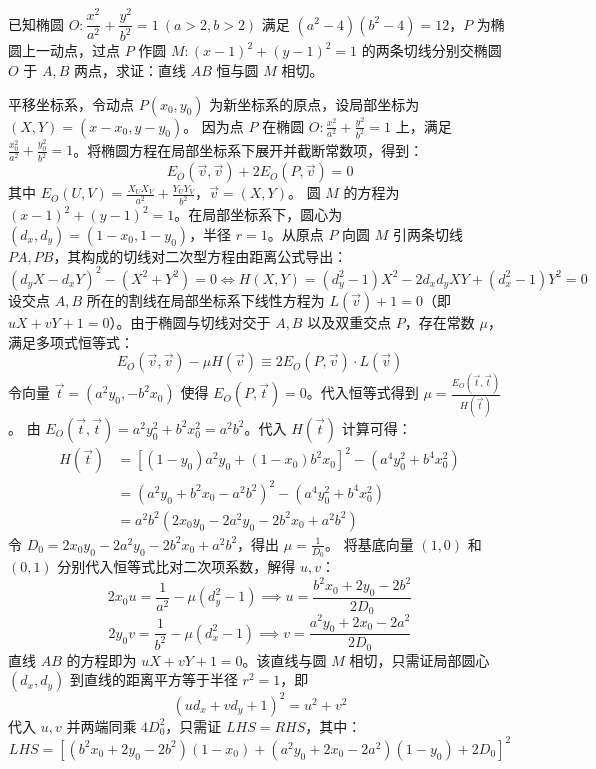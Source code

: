 \begin{exercise}
已知椭圆 \( O: \dfrac{x^2}{a^2} + \dfrac{y^2}{b^2} = 1 \ (a>2,b>2) \) 满足 \( (a^2-4)(b^2-4)=12 \)，\( P \) 为椭圆上一动点，过点 \( P \) 作圆 \( M: (x-1)^2 + (y-1)^2 = 1 \) 的两条切线分别交椭圆 \( O \) 于 \( A,B \) 两点，求证：直线 \( AB \) 恒与圆 \( M \) 相切。
\end{exercise}
\begin{solution}
平移坐标系，令动点 $P(x_0, y_0)$ 为新坐标系的原点，设局部坐标为 $(X, Y) = (x-x_0, y-y_0)$。
因为点 $P$ 在椭圆 $O: \frac{x^2}{a^2} + \frac{y^2}{b^2} = 1$ 上，满足 $\frac{x_0^2}{a^2} + \frac{y_0^2}{b^2} = 1$。将椭圆方程在局部坐标系下展开并截断常数项，得到：
$$ E_O(\vec{v}, \vec{v}) + 2E_O(P, \vec{v}) = 0 $$
其中 $E_O(U,V) = \frac{X_U X_V}{a^2} + \frac{Y_U Y_V}{b^2}$，$\vec{v} = (X, Y)$。
圆 $M$ 的方程为 $(x-1)^2 + (y-1)^2 = 1$。在局部坐标系下，圆心为 $(d_x, d_y) = (1-x_0, 1-y_0)$，半径 $r=1$。从原点 $P$ 向圆 $M$ 引两条切线 $PA, PB$，其构成的切线对二次型方程由距离公式导出：
$$ (d_y X - d_x Y)^2 - (X^2 + Y^2) = 0\Leftrightarrow H(X, Y) = (d_y^2 - 1)X^2 - 2d_x d_y XY + (d_x^2 - 1)Y^2 = 0 $$
设交点 $A, B$ 所在的割线在局部坐标系下线性方程为 $L(\vec{v}) + 1 = 0$（即 $uX + vY + 1 = 0$）。由于椭圆与切线对交于 $A, B$ 以及双重交点 $P$，存在常数 $\mu$，满足多项式恒等式：
$$ E_O(\vec{v}, \vec{v}) - \mu H(\vec{v}) \equiv 2E_O(P, \vec{v}) \cdot L(\vec{v}) $$
令向量 $\vec{t} = (a^2 y_0, -b^2 x_0)$ 使得 $E_O(P, \vec{t}) = 0$。代入恒等式得到 $\mu = \frac{E_O(\vec{t}, \vec{t})}{H(\vec{t})}$。
由 $E_O(\vec{t}, \vec{t}) = a^2 y_0^2 + b^2 x_0^2 = a^2 b^2$。代入 $H(\vec{t})$ 计算可得：
\begin{align*}
H(\vec{t}) &= [(1-y_0)a^2 y_0 + (1-x_0)b^2 x_0]^2 - (a^4 y_0^2 + b^4 x_0^2)\\
&= (a^2 y_0 + b^2 x_0 - a^2 b^2)^2 - (a^4 y_0^2 + b^4 x_0^2)\\
&= a^2 b^2 (2x_0 y_0 - 2a^2 y_0 - 2b^2 x_0 + a^2 b^2)
\end{align*}
令 $D_0 = 2x_0 y_0 - 2a^2 y_0 - 2b^2 x_0 + a^2 b^2$，得出 $\mu = \frac{1}{D_0}$。
将基底向量 $(1,0)$ 和 $(0,1)$ 分别代入恒等式比对二次项系数，解得 $u, v$：
$$ 2x_0 u = \frac{1}{a^2} - \mu(d_y^2 - 1) \implies u = \frac{b^2 x_0 + 2y_0 - 2b^2}{2 D_0} $$
$$ 2y_0 v = \frac{1}{b^2} - \mu(d_x^2 - 1) \implies v = \frac{a^2 y_0 + 2x_0 - 2a^2}{2 D_0} $$
直线 $AB$ 的方程即为 $uX + vY + 1 = 0$。该直线与圆 $M$ 相切，只需证局部圆心 $(d_x, d_y)$ 到直线的距离平方等于半径 $r^2=1$，即
$$ (u d_x + v d_y + 1)^2 = u^2 + v^2 $$
代入 $u, v$ 并两端同乘 $4D_0^2$，只需证 $LHS = RHS$，其中：
$$ LHS = [ (b^2 x_0 + 2y_0 - 2b^2)(1-x_0) + (a^2 y_0 + 2x_0 - 2a^2)(1-y_0) + 2D_0 ]^2 $$

\end{solution}
